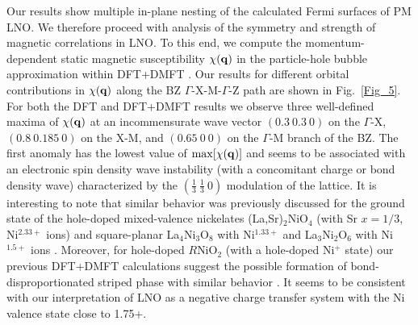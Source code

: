 \documentclass[prl,twocolumn,preprintnumbers,superscriptaddress]{revtex4-1}
\begin{document}
Our results show multiple in-plane nesting of the calculated Fermi surfaces of PM LNO. We therefore proceed with analysis of the symmetry and strength of magnetic 
correlations in LNO. To this end, we compute the momentum-dependent static magnetic susceptibility $\chi({\bf q})$ in the particle-hole bubble approximation within DFT+DMFT \cite{Skornyakov_2017,Skornyakov_2018}.  
Our results for different orbital contributions in $\chi({\bf q})$ along the BZ $\Gamma$-X-M-$\Gamma$-Z path are shown in Fig.~\ref{Fig_5}. For both the DFT and DFT+DMFT results we observe 
three well-defined maxima of $\chi({\bf q})$ at an incommensurate wave vector $(0.3~0.3~0)$ on the $\Gamma$-X, $(0.8~0.185~0)$  on the X-M, and $(0.65~0~0)$ on the $\Gamma$-M branch of the BZ.
The first anomaly has the lowest value of $\mathrm{max}[\chi({\bf q})]$ and seems to be associated with an electronic spin density wave instability (with a concomitant charge or bond density wave) characterized by 
the $(\frac{1}{3}~\frac{1}{3}~0)$ modulation of the lattice. It is interesting to note that similar behavior was previously discussed 
for the ground state of the hole-doped mixed-valence nickelates (La,Sr)$_2$NiO$_4$ (with Sr $x = 1/3$, Ni$^{2.33+}$ ions) and square-planar La$_4$Ni$_3$O$_8$ with Ni$^{1.33+}$ and La$_3$Ni$_2$O$_6$ with Ni$^{1.5+}$ ions \cite{Lee_1997,Yoshizawa_2000,Botana_2016,Zhanga_2016,
Bernal_2019,Zhang_2019,Zhang_2020,Hao_2021,Lee_1997,Yoshizawa_2000}. Moreover, for hole-doped $R$NiO$_2$ (with a hole-doped Ni$^{+}$ state) our previous DFT+DMFT calculations suggest 
the possible formation of bond-disproportionated striped phase with similar behavior \cite{Slobodchikov_2022,Shen_2023,Chen_2022}. It seems to be consistent with our interpretation of LNO as a negative charge transfer system with the Ni valence state close to 1.75+. 
\end{document}
